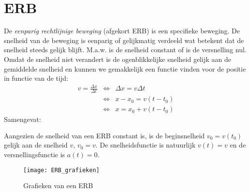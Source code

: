 \documentclass{ximera}
\begin{document}
	\author{Bart Lambregs}
    \xmsource



	\section{ERB}

	De \emph{eenparig rechtlijnige beweging} (afgekort ERB) is een specifieke beweging. De snelheid van de beweging is eenparig of gelijkmatig verdeeld wat betekent dat de snelheid steeds gelijk blijft. M.a.w. is de snelheid constant of is de versnelling nul. Omdat de snelheid niet verandert is de ogenblikkelijke snelheid gelijk aan de gemiddelde snelheid en kunnen we gemakkelijk een functie vinden voor de positie in functie van de tijd:
	\begin{eqnarray*}
	v=\frac{\Delta x}{\Delta t}&\Leftrightarrow&\Delta x=v\Delta t\\
	&\Leftrightarrow&x-x_0=v(t-t_0)\\
	&\Leftrightarrow&x=x_0+v(t-t_0)
	\end{eqnarray*}
	Samengevat:
	
	
	Aangezien de snelheid van een ERB constant is, is de beginsnelheid $v_0=v(t_0)$ gelijk aan de snelheid $v$, $v_0=v$. De snelheidsfunctie is natuurlijk $v(t)=v$ en de versnellingsfunctie is $a(t)=0$.
	\begin{figure}[h]
	\centering
	\texttt{[image: ERB\_grafieken]}
	\caption{Grafieken van een ERB}
	\end{figure}
	
	
	
\end{document}
